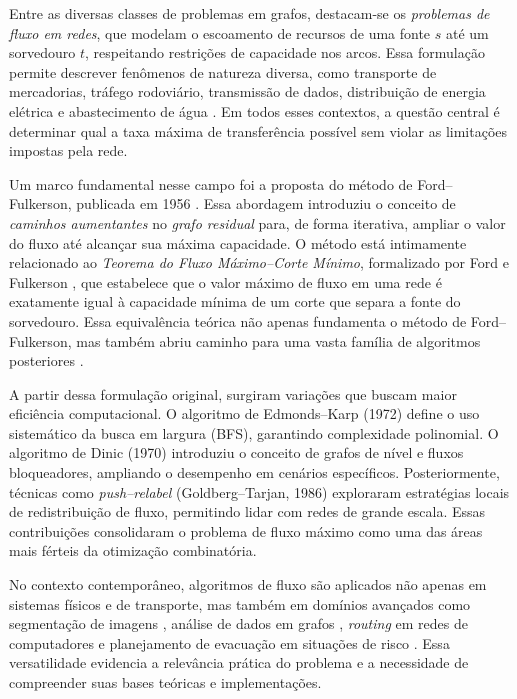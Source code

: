 \documentclass[12pt]{article}
\begin{document}
\noindent Entre as diversas classes de problemas em grafos, destacam-se os \emph{problemas de fluxo em redes}, que modelam o escoamento de recursos de uma fonte $s$ até um sorvedouro $t$, respeitando restrições de capacidade nos arcos. Essa formulação permite descrever fenômenos de natureza diversa, como transporte de mercadorias, tráfego rodoviário, transmissão de dados, distribuição de energia elétrica e abastecimento de água \cite{ahuja1993,ahuja1990}. Em todos esses contextos, a questão central é determinar qual a taxa máxima de transferência possível sem violar as limitações impostas pela rede.

\noindent Um marco fundamental nesse campo foi a proposta do método de Ford–Fulkerson, publicada em 1956 \cite{ford1956}. Essa abordagem introduziu o conceito de \emph{caminhos aumentantes} no \emph{grafo residual} para, de forma iterativa, ampliar o valor do fluxo até alcançar sua máxima capacidade. O método está intimamente relacionado ao \emph{Teorema do Fluxo Máximo–Corte Mínimo}, formalizado por Ford e Fulkerson \cite{ford1956}, que estabelece que o valor máximo de fluxo em uma rede é exatamente igual à capacidade mínima de um corte que separa a fonte do sorvedouro. Essa equivalência teórica não apenas fundamenta o método de Ford–Fulkerson, mas também abriu caminho para uma vasta família de algoritmos posteriores \cite{cormen2009}.

\noindent A partir dessa formulação original, surgiram variações que buscam maior eficiência computacional. O algoritmo de Edmonds–Karp (1972) \cite{edmonds1972} define o uso sistemático da busca em largura (BFS), garantindo complexidade polinomial. O algoritmo de Dinic (1970) \cite{dinic1970} introduziu o conceito de grafos de nível e fluxos bloqueadores, ampliando o desempenho em cenários específicos. Posteriormente, técnicas como \emph{push–relabel} (Goldberg–Tarjan, 1986) \cite{goldberg1988} exploraram estratégias locais de redistribuição de fluxo, permitindo lidar com redes de grande escala. Essas contribuições consolidaram o problema de fluxo máximo como uma das áreas mais férteis da otimização combinatória.

\noindent No contexto contemporâneo, algoritmos de fluxo são aplicados não apenas em sistemas físicos e de transporte, mas também em domínios avançados como segmentação de imagens \cite{boykov2001}, análise de dados em grafos \cite{ahuja1993}, \emph{routing} em redes de computadores \cite{kleinberg2006} e planejamento de evacuação em situações de risco \cite{chen2010}. Essa versatilidade evidencia a relevância prática do problema e a necessidade de compreender suas bases teóricas e implementações.
\end{document}
